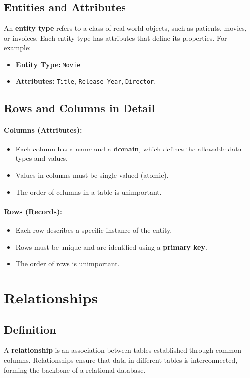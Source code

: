 \documentclass{article}
\begin{document}
\subsection{Entities and Attributes}
An \textbf{entity type} refers to a class of real-world objects, such as patients, movies, or invoices. Each entity type has attributes that define its properties. For example:
\begin{itemize}
    \item \textbf{Entity Type:} \texttt{Movie}
    \item \textbf{Attributes:} \texttt{Title}, \texttt{Release Year}, \texttt{Director}.
\end{itemize}

\subsection{Rows and Columns in Detail}
\paragraph{Columns (Attributes):}
\begin{itemize}
    \item Each column has a name and a \textbf{domain}, which defines the allowable data types and values.
    \item Values in columns must be single-valued (atomic).
    \item The order of columns in a table is unimportant.
\end{itemize}

\paragraph{Rows (Records):}
\begin{itemize}
    \item Each row describes a specific instance of the entity.
    \item Rows must be unique and are identified using a \textbf{primary key}.
    \item The order of rows is unimportant.
\end{itemize}

\section{Relationships}
\subsection{Definition}
A \textbf{relationship} is an association between tables established through common columns. Relationships ensure that data in different tables is interconnected, forming the backbone of a relational database.
\end{document}
